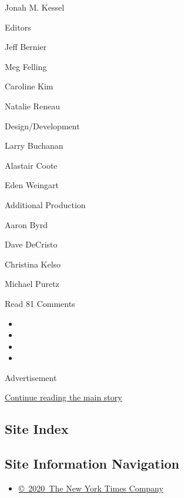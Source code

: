Jonah M. Kessel

Editors

Jeff Bernier

Meg Felling

Caroline Kim

Natalie Reneau

Design/Development

Larry Buchanan

Alastair Coote

Eden Weingart

Additional Production

Aaron Byrd

Dave DeCristo

Christina Kelso

Michael Puretz

Read 81 Comments

\begin{itemize}
\item
\item
\item
\item
\end{itemize}

Advertisement

\protect\hyperlink{after-bottom}{Continue reading the main story}

\hypertarget{site-index}{%
\subsection{Site Index}\label{site-index}}

\hypertarget{site-information-navigation}{%
\subsection{Site Information
Navigation}\label{site-information-navigation}}

\begin{itemize}
\tightlist
\item
  \href{https://help.nytimes3xbfgragh.onion/hc/en-us/articles/115014792127-Copyright-notice}{©~2020~The
  New York Times Company}
\end{itemize}

